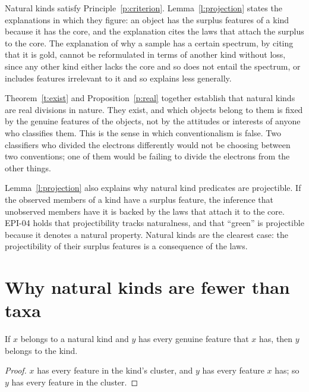 \documentclass{situationist-preprint}
\begin{document}
\begin{remark}\label{r:explain}
Natural kinds satisfy Principle~\ref{p:criterion}. Lemma~\ref{l:projection} states the explanations in which they figure: an object has the surplus features of a kind because it has the core, and the explanation cites the laws that attach the surplus to the core. The explanation of why a sample has a certain spectrum, by citing that it is gold, cannot be reformulated in terms of another kind without loss, since any other kind either lacks the core and so does not entail the spectrum, or includes features irrelevant to it and so explains less generally.
\end{remark}

Theorem~\ref{t:exist} and Proposition~\ref{p:real} together establish that natural kinds are real divisions in nature. They exist, and which objects belong to them is fixed by the genuine features of the objects, not by the attitudes or interests of anyone who classifies them. This is the sense in which conventionalism is false. Two classifiers who divided the electrons differently would not be choosing between two conventions; one of them would be failing to divide the electrons from the other things.

Lemma~\ref{l:projection} also explains why natural kind predicates are projectible. If the observed members of a kind have a surplus feature, the inference that unobserved members have it is backed by the laws that attach it to the core. EPI-04 holds that projectibility tracks naturalness, and that \enquote{green} is projectible because it denotes a natural property. Natural kinds are the clearest case: the projectibility of their surplus features is a consequence of the laws.

\section{Why natural kinds are fewer than taxa}\label{s:fewer}

\begin{lemma}\label{l:upward}
If $x$ belongs to a natural kind and $y$ has every genuine feature that $x$ has, then $y$ belongs to the kind.
\end{lemma}

\begin{proof}
$x$ has every feature in the kind's cluster, and $y$ has every feature $x$ has; so $y$ has every feature in the cluster.
\end{proof}
\end{document}
